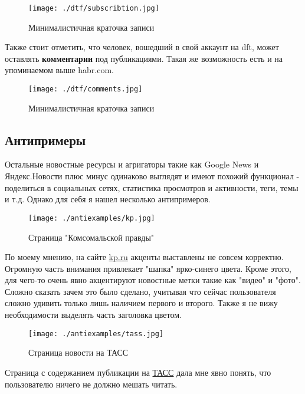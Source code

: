   \begin{figure}[!ht]
    \centering
      \texttt{[image: ./dtf/subscribtion.jpg]}
      \caption{Минималистичная краточка записи}
    \label{dtf-subscribtion}
  \end{figure}

  Также стоит отметить, что человек, вошедший в свой аккаунт на dft, может оставлять \textbf{комментарии} под публикациями. Такая же возможность есть и на упоминаемом выше habr.com.

  \begin{figure}[!ht]
    \centering
      \texttt{[image: ./dtf/comments.jpg]}
      \caption{Минималистичная краточка записи}
    \label{dtf-comments}
  \end{figure}

  \subsection{Антипримеры}

  Остальные новостные ресурсы и агригаторы такие как Google News и Яндекс.Новости плюс минус одинаково выглядят и имеют похожий функционал - поделиться в социальных сетях, статистика просмотров и активности, теги, темы и т.д. Однако для себя я нашел несколько антипримеров.

  \begin{figure}[!ht]
    \centering
      \texttt{[image: ./antiexamples/kp.jpg]}
      \caption{Страница "Комсомальской правды"}
    \label{kp}
  \end{figure}
  
  По моему мнению, на сайте \href{https://www.kp.ru/}{kp.ru} акценты выставлены не совсем корректно. Огромную часть внимания привлекает "шапка" ярко-синего цвета. Кроме этого, для чего-то очень явно акцентируют новостные метки такие как "видео" и "фото". Сложно сказать зачем это было сделано, учитывая что сейчас пользователя сложно удивить только лишь наличием первого и второго. Также я не вижу необходимости выделять часть заголовка цветом.

  \begin{figure}[!ht]
    \centering
      \texttt{[image: ./antiexamples/tass.jpg]}
      \caption{Страница новости на ТАСС}
    \label{tass}
  \end{figure}

  Страница с содержанием публикации на \href{https://tass.ru/}{ТАСС} дала мне явно понять, что пользователю ничего не должно мешать читать.

